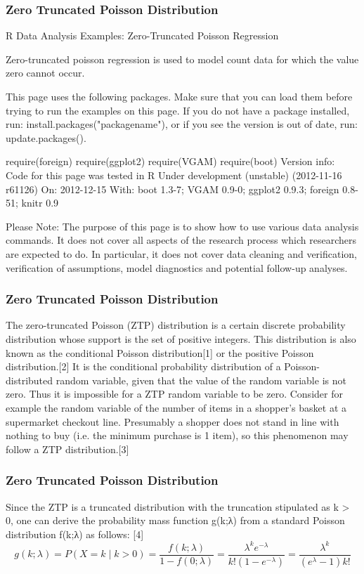 \documentclass[MASTER.tex]{subfiles}
\begin{document}
\begin{frame}
\frametitle{Zero Truncated Poisson Distribution}
\Large

R Data Analysis Examples: Zero-Truncated Poisson Regression

Zero-truncated poisson regression is used to model count data for which the value zero cannot occur.

This page uses the following packages. Make sure that you can load them before trying to run the examples on this page. If you do not have a package installed, run: install.packages("packagename"), or if you see the version is out of date, run: update.packages().

require(foreign)
require(ggplot2)
require(VGAM)
require(boot)
Version info: Code for this page was tested in R Under development (unstable) (2012-11-16 r61126)
On: 2012-12-15
With: boot 1.3-7; VGAM 0.9-0; ggplot2 0.9.3; foreign 0.8-51; knitr 0.9

Please Note: The purpose of this page is to show how to use various data analysis commands. It does not cover all aspects of the research process which researchers are expected to do. In particular, it does not cover data cleaning and verification, verification of assumptions, model diagnostics and potential follow-up analyses.
\end{frame}
\begin{frame}
\frametitle{Zero Truncated Poisson Distribution}
\Large

The zero-truncated Poisson (ZTP) distribution is a certain discrete probability distribution whose support is the set of positive integers. This distribution is also known as the conditional Poisson distribution[1] or the positive Poisson distribution.[2] It is the conditional probability distribution of a Poisson-distributed random variable, given that the value of the random variable is not zero. Thus it is impossible for a ZTP random variable to be zero. Consider for example the random variable of the number of items in a shopper's basket at a supermarket checkout line. Presumably a shopper does not stand in line with nothing to buy (i.e. the minimum purchase is 1 item), so this phenomenon may follow a ZTP distribution.[3]

\end{frame}
\begin{frame}
\frametitle{Zero Truncated Poisson Distribution}
\Large
Since the ZTP is a truncated distribution with the truncation stipulated as k > 0, one can derive the probability mass 
function g(k;λ) from a standard Poisson distribution f(k;λ) as follows: [4]
\[g(k;\lambda) = P(X = k \mid k > 0) = 
\frac{f(k;\lambda)}{1-f(0;\lambda)} = 
\frac{\lambda ^ k e^{- \lambda} }{k ! \left ( 1 - e^{- \lambda} \right )} = \frac{\lambda^k}{(e^\lambda-1)k!}\]

\end{frame}
\end{document}
